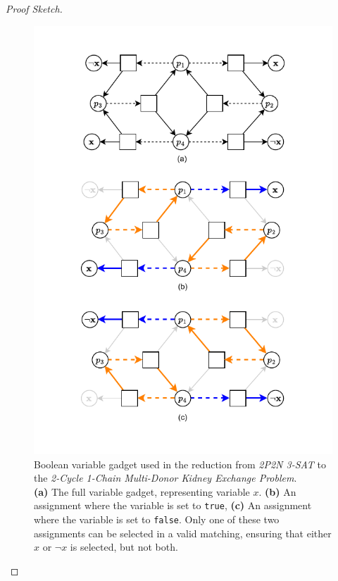 \begin{proof}[Proof Sketch]
\begin{figure}
    \centering
    \includegraphics{data/sat_reduction_boolean_gadget.pdf}
    \caption[Boolean variable gadget used in the reduction from \textit{2P2N 3-SAT} to the \textit{2-Cycle 1-Chain Multi-Donor Kidney Exchange Problem}]{Boolean variable gadget used in the reduction from \textit{2P2N 3-SAT} to the \textit{2-Cycle 1-Chain Multi-Donor Kidney Exchange Problem}.\\
    \textbf{(a)} The full variable gadget, representing variable \(x\). \textbf{(b)} An assignment where the variable is set to \texttt{true}, \textbf{(c)} An assignment where the variable is set to \texttt{false}. Only one of these two assignments can be selected in a valid matching, ensuring that either \(x\) or \(\neg{x}\) is selected, but not both.}\label{fig:sat_reduction_boolean_gadget}
\end{figure}


\end{proof}

